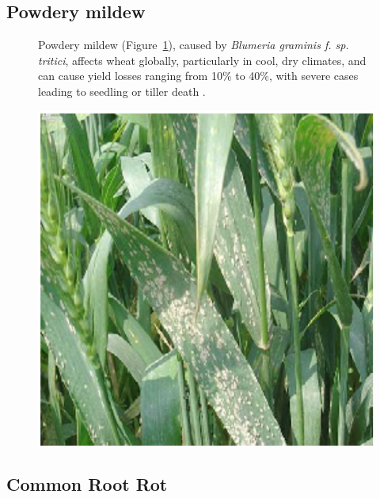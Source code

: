 \subsection{Powdery mildew} 

\begin{figure}[H]
    \centering
    \begin{minipage}{0.55\textwidth}
        
        Powdery mildew (Figure~\ref{fig:Figure09}), caused by \textit{Blumeria graminis f. sp. tritici}, affects wheat globally, particularly in cool, dry climates, and can cause yield losses ranging from 10\% to 40\%, with severe cases leading to seedling or tiller death \parencite{singh2023wheat}.
    \end{minipage}%
    \hfill
    \begin{minipage}{0.4\textwidth}
        \centering
        \includegraphics[width=0.5\linewidth]{chapters/chapter2/images/Figure09.png}
        \label{fig:Figure09}
    \end{minipage}
\end{figure}

\subsection{Common Root Rot}

